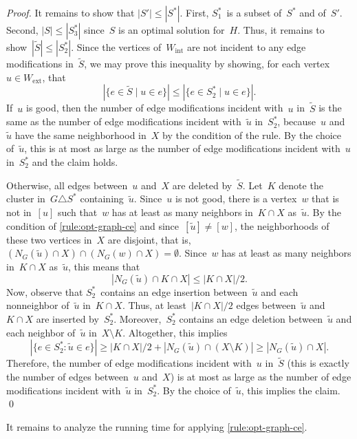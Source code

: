 \documentclass[envcountsame,numbook,smallextended]{svjour3}
\numberwithin{equation}{section}
\numberwithin{figure}{section}
\newcommand{\symdiff}{\triangle}
\newcommand{\Wext}{\ensuremath{W_\text{ext}}}
\newcommand{\Wint}{\ensuremath{W_\text{int}}}
\begin{document}
\begin{proof}
  It remains to show that $|S'|\le |S^*|$.
  First, $S^*_1$~is a subset of~$S^*$ and of~$S'$. Second, $|S|\le |S_3^*|$
  since~$S$ is an optimal solution for~$H$. Thus, it remains
  to show~$|\tilde{S}|\le |S^*_2|$. Since the vertices of~$\Wint$ are not incident to any edge modifications in~$\tilde{S}$, we may prove this inequality by showing, for each
  vertex~$u\in \Wext$, that~$$|\{e\in \tilde{S} \mid u\in e\}|\le |\{e\in S^*_2 \mid
  u\in e\}|.$$
  If~$u$ is good, then the number of edge modifications incident
  with~$u$ in~$\tilde{S}$ is the same as the number of edge
  modifications incident with~$\tilde{u}$ in~$S^*_2$, because~$u$
  and~$\tilde{u}$ have the same neighborhood in~$X$ by the condition of
  the rule. By the choice of~$\tilde{u}$, this is at most as large as the
  number of edge modifications incident with~$u$ in~$S_2^*$ and the
  claim holds.
  
  Otherwise, all edges between~$u$ and~$X$ are deleted
  by~$\tilde{S}$. Let~$K$ denote the cluster in~$G\symdiff{} S^*$
  containing~$\tilde{u}$. Since~$u$ is not good, there is a vertex~$w$
  that is not in~$[u]$ such that~$w$ has at least as many neighbors
  in~$K\cap X$ as~$\tilde{u}$. By the condition of
  \cref{rule:opt-graph-ce} and since~$[\tilde{u}]\neq [w]$, the
  neighborhoods of these two vertices in~$X$ are disjoint, that
  is, $(N_G(\tilde{u})\cap X)\cap (N_G(w)\cap X)=\emptyset$. Since~$w$
  has at least as many neighbors in~$K\cap X$ as~$\tilde{u}$, this means
  that~$$|N_G(\tilde{u})\cap K\cap X|\le |K\cap X|/2.$$ Now, observe that $S^*_2$~contains an edge insertion between~$\tilde{u}$
  and each nonneighbor of~$\tilde{u}$ in~$K\cap X$. Thus, at least~$|K\cap X|/2$ edges between~$\tilde{u}$ and~$K\cap X$ are inserted by~$S^*_2$. Moreover,~$S^*_2$ contains an edge deletion between~$\tilde{u}$ and each neighbor of~$\tilde{u}$ in~$X\setminus K$.
  Altogether, this implies $$|\{e\in S^*_2 : \tilde{u}\in e\}| \ge |K\cap X|/2 + |N_G(\tilde{u})\cap (X\setminus K)| \ge |N_G(\tilde{u})\cap X|.$$
  Therefore, the number of edge modifications incident with~$u$ in~$\tilde{S}$ (this is exactly the number of edges  
  between~$u$ and~$X$) is at most as large as the number of edge modifications incident with~$\tilde{u}$ in~$S^*_2$.
  By the choice of~$\tilde{u}$, this implies the claim.  \qed
\end{proof}
It remains to analyze the running time
for applying \cref{rule:opt-graph-ce}.
\end{document}
